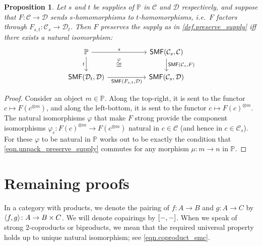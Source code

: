 \documentclass[11pt, oneside, article]{memoir}
\theoremstyle{plain}
\newtheorem{proposition}[theorem]{Proposition}
\theoremstyle{definition}
\theoremstyle{remark}
\newcommand{\cat}[1]{\mathcal{#1}}%
\newcommand{\Cat}[1]{{\mathsf{#1}}}%
\DeclarePairedDelimiter{\pair}{\langle}{\rangle}
\DeclarePairedDelimiter{\copair}{[}{]}
\newcommand{\tpow}[1]{^{\otimes #1}}
\newcommand{\smf}{\Cat{SMF}}
\newcommand{\pp}{\mathbb{P}}
\begin{document}
\begin{proposition}\label{prop.easy_pres_supply}
Let $s$ and $t$ be supplies of $\pp$ in $\cat{C}$ and $\cat{D}$ respectively, and suppose that $F\colon\cat{C}\to\cat{D}$ sends $s$-homomorphisms to $t$-homomorphisms, i.e.\ $F$ factors through $F_{s,t}\colon\cat{C}_s\to\cat{D}_t$. Then $F$ preserves the supply as in \cref{def.preserve_supply} iff there exists a natural isomorphism:
\begin{equation}\label{eqn.pres_supply}
\begin{tikzcd}[column sep=55pt]
	\pp\ar[r, "s"]\ar[d, "t"']&
	\smf(\cat{C}_s,\cat{C})\ar[d, "{\smf(\cat{C}_s,F)}"]\\
	\smf(\cat{D}_t,\cat{D})\ar[r, "{\smf(F_{s,t},\cat{D})}"']&
	\smf(\cat{C}_s,\cat{D})\ar[ul, phantom, "\overset{\varphi}{\cong}"]
\end{tikzcd}
\end{equation}
\end{proposition}
\begin{proof}
Consider an object $m\in\pp$. Along the top-right, it is sent to the functor $c\mapsto F(c\tpow{m})$, and along the left-bottom, it is sent to the functor $c\mapsto F(c)\tpow{m}$. The natural isomorphisms $\varphi$ that make $F$ strong provide the component isomorphisms $\varphi_c\colon F(c)\tpow{m}\to F(c\tpow{m})$ natural in $c\in\cat{C}$ (and hence in $c\in\cat{C}_s$). For these $\varphi$ to be natural in $\pp$ works out to be exactly the condition that  \cref{eqn.unpack_preserve_supply} commutes for any morphism $\mu\colon m\to n$ in $\pp$.
\end{proof}



\appendix

\chapter{Remaining proofs}\label{chap.proofs}


In a category with products, we denote the pairing of $f\colon A\to B$ and $g\colon A\to C$ by $\pair{f,g}\colon A\to B\times C$. We will denote copairings by $\copair{-,-}$. When we speak of strong 2-coproducts or biproducts, we mean that the required universal property holds up to unique natural isomorphism; see \cref{eqn.coproduct_smc}.
\end{document}
